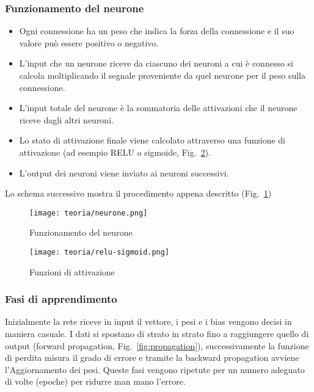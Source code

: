 \subsubsection{Funzionamento del neurone}

\begin{itemize}
    \item Ogni connessione ha un peso che indica la forza della connessione e il suo valore può essere positivo o negativo.
    \item L'input che un neurone riceve da ciascuno dei neuroni a cui è connesso si calcola moltiplicando il segnale proveniente da quel neurone per il peso sulla connessione.
    \item L'input totale del neurone è la sommatoria delle attivazioni che il neurone riceve dagli altri neuroni.
    \item Lo stato di attivazione finale viene calcolato attraverso una funzione di attivazione (ad esempio RELU o sigmoide, Fig.~\ref{fig:relu-sigmoid}).
    \item L'output dei neuroni viene inviato ai neuroni successivi.
\end{itemize}
Lo schema successivo mostra il procedimento appena descritto (Fig.~\ref{fig:neurone})

\begin{figure}[!h] 
    \centering 
    \texttt{[image: teoria/neurone.png]} 
    \caption{Funzionamento del neurone}
    \label{fig:neurone}
  \end{figure}

  \begin{figure}[!h] 
    \centering 
    \texttt{[image: teoria/relu-sigmoid.png]} 
    \caption{Funzioni di attivazione}
    \label{fig:relu-sigmoid}
  \end{figure}

\newpage

\subsubsection{Fasi di apprendimento} 
Inizialmente la rete riceve in input il vettore, i pesi e i bias vengono decisi in maniera casuale.
I dati si spostano di strato in strato fino a raggiungere quello di output (forward propagation, Fig.~\ref{fig:propagation}), successivamente la funzione di perdita misura il grado di errore e tramite la backward propagation avviene l'Aggiornamento dei pesi.
Queste fasi vengono ripetute per un numero adeguato di volte (epoche) per ridurre man mano l'errore.

